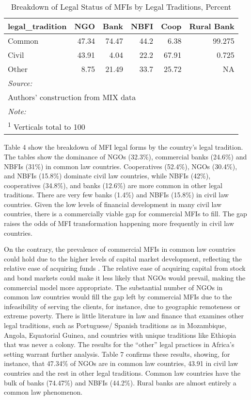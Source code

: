 \documentclass[a4paper,nobind]{templates/ociamthesis}
\begin{document}
\begin{table}

\caption{\label{tab:unnamed-chunk-21}Breakdown of Legal Status of MFIs by Legal Traditions, Percent}
\centering
\begin{tabular}[t]{lrrrrr}
\toprule
legal\_tradition & NGO & Bank & NBFI & Coop & Rural Bank\\
\midrule
Common & 47.34 & 74.47 & 44.2 & 6.38 & 99.275\\
Civil & 43.91 & 4.04 & 22.2 & 67.91 & 0.725\\
Other & 8.75 & 21.49 & 33.7 & 25.72 & NA\\
\bottomrule
\multicolumn{6}{l}{\rule{0pt}{1em}\textit{Source: }}\\
\multicolumn{6}{l}{\rule{0pt}{1em}Authors' construction from MIX data}\\
\multicolumn{6}{l}{\rule{0pt}{1em}\textit{Note: }}\\
\multicolumn{6}{l}{\rule{0pt}{1em}\textsuperscript{1} Verticals total to 100}\\
\end{tabular}
\end{table}

Table 4 show the breakdown of MFI legal forms by the country's legal tradition. The tables show the dominance of NGOs (32.3\%), commercial banks (24.6\%) and NBFIs (31\%) in common law countries. Cooperatives (52.4\%), NGOs (30.4\%), and NBFIs (15.8\%) dominate civil law countries, while NBFIs (42\%), cooperatives (34.8\%), and banks (12.6\%) are more common in other legal traditions. There are very few banks (1.4\%) and NBFIs (15.8\%) in civil law countries. Given the low levels of financial development in many civil law countries, there is a commercially viable gap for commercial MFIs to fill. The gap raises the odds of MFI transformation happening more frequently in civil law countries.

On the contrary, the prevalence of commercial MFIs in common law countries could hold due to the higher levels of capital market development, reflecting the relative ease of acquiring funds \autocite{schnyder2018twenty}. The relative ease of acquiring capital from stock and bond markets could make it less likely that NGOs would prevail, making the commercial model more appropriate. The substantial number of NGOs in common law countries would fill the gap left by commercial MFIs due to the infeasibility of serving the clients, for instance, due to geographic remoteness or extreme poverty. There is little literature in law and finance that examines other legal traditions, such as Portuguese/ Spanish traditions as in Mozambique, Angola, Equatorial Guinea, and countries with unique traditions like Ethiopia that was never a colony. The results for the ``other'' legal practices in Africa's setting warrant further analysis. Table 7 confirms these results, showing, for instance, that 47.34\% of NGOs are in common law countries, 43.91 in civil law countries and the rest in other legal traditions. Common law countries have the bulk of banks (74.47\%) and NBFIs (44.2\%). Rural banks are almost entirely a common law phenomenon.
\end{document}
